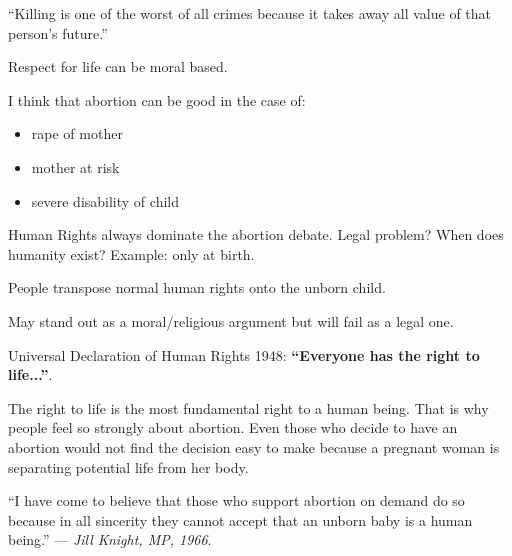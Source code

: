 \documentclass{article}
\begin{document}
``Killing is one of the worst of all crimes because it takes away all value of that person's future.''

Respect for life can be moral based.

I think that abortion can be good in the case of:
\begin{itemize}
\item{rape of mother}
\item{mother at risk}
\item{severe disability of child}
\end{itemize}

Human Rights always dominate the abortion debate.  Legal problem?  When does humanity exist?  Example: only at birth.

People transpose normal human rights onto the unborn child.

May stand out as a moral/religious argument but will fail as a legal one.

Universal Declaration of Human Rights 1948: \textbf{``Everyone has the right to life...''}.

The right to life is the most fundamental right to a human being.  That is why people feel so strongly about abortion.  Even those who decide to have an abortion would not find the decision easy to make because a pregnant woman is separating potential life from her body.

``I have come to believe that those who support abortion on demand do so because in all sincerity they cannot accept that an unborn baby is a human being.'' --- \textit{Jill Knight, MP, 1966}.
 
\end{document}
